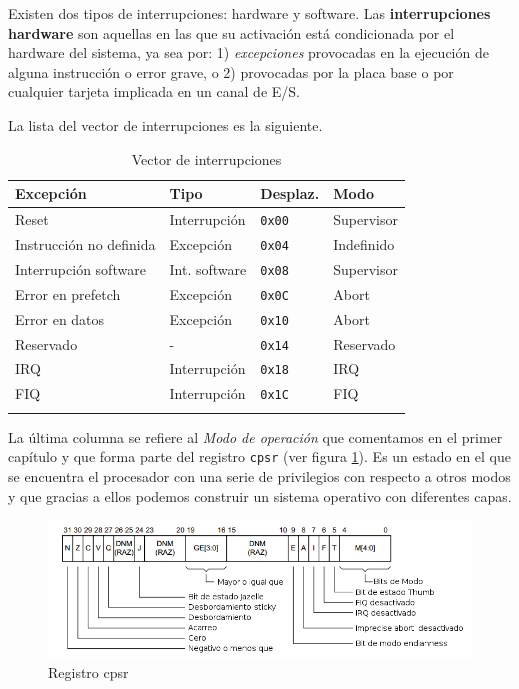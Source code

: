 Existen dos tipos de interrupciones: hardware y software. Las {\bf
interrupciones hardware} son aquellas en las que su activación está
condicionada por el hardware del sistema, ya sea por: 1) {\it
excepciones} provocadas en la ejecución de alguna instrucción o error
grave, o 2) provocadas por la placa base o por cualquier tarjeta
implicada en un canal de E/S.

\noindent La lista del vector de interrupciones es la siguiente.

\begin{longtable}{ p{4.5cm} | p{2.5cm} | p{2cm} | p{4cm}}
\hline
{\bf Excepción} & {\bf Tipo} & {\bf Desplaz.} & {\bf Modo} \\ \hline
Reset                   & Interrupción & {\tt 0x00} & Supervisor \\ \hline
Instrucción no definida & Excepción & {\tt 0x04} & Indefinido \\ \hline
Interrupción software   & Int. software & {\tt 0x08} & Supervisor \\ \hline
Error en prefetch       & Excepción & {\tt 0x0C} & Abort \\ \hline
Error en datos          & Excepción & {\tt 0x10} & Abort \\ \hline
Reservado               & - & {\tt 0x14} & Reservado \\ \hline
IRQ                     & Interrupción & {\tt 0x18} & IRQ \\ \hline
FIQ                     & Interrupción & {\tt 0x1C} & FIQ \\ \hline
\caption{Vector de interrupciones}
\label{tab:excepciones}
\end{longtable}

La última columna se refiere al {\it Modo de operación} que comentamos en el primer
capítulo y que forma parte del registro {\tt cpsr} (ver figura \ref{fig:cpsr}).
Es un estado en el que se encuentra el procesador con una serie de privilegios
con respecto a otros modos y que gracias a ellos podemos construir un sistema operativo
con diferentes capas.

\begin{figure}[h]
  \centering
    \includegraphics[width=14cm]{graphs/cpsr.png}
  \caption{Registro cpsr}
  \label{fig:cpsr}
\end{figure}

